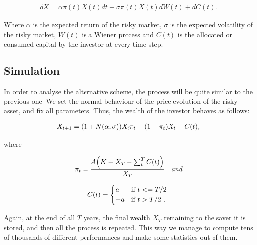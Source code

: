 \begin{align}
    dX = \alpha \pi(t)X(t)dt + \sigma \pi(t)X(t)dW(t) + dC(t)\textit{.}
\end{align}

Where $\alpha$ is the expected return of the risky market, $\sigma$ is the expected volatility of the risky market, $W(t)$ is a Wiener process and $C(t)$ is the allocated or consumed capital by the investor at every time step.

\subsection*{Simulation}

In order to analyse the alternative scheme, the process will be quite similar to the previous one. We set the normal behaviour of the price evolution of the risky asset, and fix all parameters. Thus, the wealth of the investor behaves as follows:

\begin{align}
    X_{t+1} = \qty(1+N(\alpha, \sigma))X_t \pi_t + \qty(1 - \pi_t)X_t + C(t) \textit{,}
\end{align}

where

\begin{align}
    \pi_t = \frac{A\qty(K + X_T + \sum_t^T C(t))}{X_T} \quad \textit{and}
\end{align}

\begin{equation*}
    C(t) =
    \begin{cases*}
      a & if $t <= T/2$ \\
      -a       & if $t > T/2$ \textit{.}
    \end{cases*}
\end{equation*}

Again, at the end of all $T$ years, the final wealth $X_T$ remaining to the saver it is stored, and then all the process is repeated. This way we manage to compute tens of thousands of different performances and make some statistics out of them.

